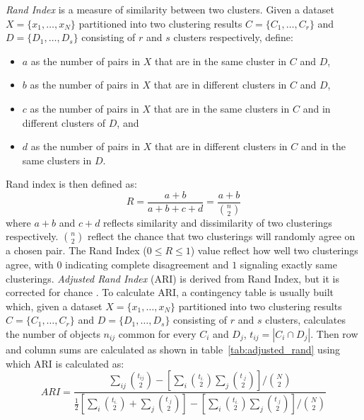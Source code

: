 \textit{Rand Index} is a measure of similarity between two clusters. \citep{santos2009use}
Given a dataset $X = \{x_1, \dots, x_N\}$ partitioned into two clustering results
$C = \{C_1, \dots, C_r\}$ and $D = \{D_1, \dots, D_s\}$ consisting of $r$ and $s$ clusters
respectively, define:
\begin{itemize}
\item $a$ as the number of pairs in $X$ that are in the same cluster in $C$ and $D$,
\item $b$ as the number of pairs in $X$ that are in different clusters in $C$ and $D$,
\item $c$ as the number of pairs in $X$ that are in the same clusters in $C$ and in different clusters of $D$, and
\item $d$ as the number of pairs in $X$ that are in different clusters in $C$ and in the same clusters in $D$. 
\end{itemize}
Rand index is then defined as:
\begin{equation}\label{eq:rand_index}
	R = \frac{a + b}{a + b + c + d} = \frac{a + b}{\binom{n}{2}}
\end{equation}
where $a + b$ and $c + d$ reflects similarity and dissimilarity of two clusterings respectively.  
$\binom{n}{2}$ reflect the chance that two clusterings will randomly agree on a chosen pair. 
The Rand Index ($0 \leq R \leq 1$) value reflect how well two clusterings agree, with 
$0$ indicating complete disagreement and $1$ signaling exactly same clusterings. 
\textit{Adjusted Rand Index} (ARI) is derived from Rand Index, but it is corrected for chance
\citep{steinley2004properties}. To calculate ARI, a contingency table is usually built which, 
given a dataset $X = \{x_1, \dots, x_N\}$ partitioned into two clustering
results $C = \{C_1, \dots, C_r\}$ and $D = \{D_1, \dots, D_s\}$ consisting of
$r$ and $s$ clusters, calculates the number of objects $n_{ij}$ common for every
$C_i$ and $D_j$, $t_{ij} = |C_i \cap D_j|$. Then row and column sums are calculated 
as shown in table~\ref{tab:adjusted_rand} using which ARI is calculated as:
\begin{equation}\label{eq:adjusted_rand_index}
	ARI = \frac{\sum_{ij} \binom{t_{ij}}{2}- \left[ \sum_i \binom{t_{i.}}{2} \sum_j \binom{t_{.j}}{2} \right] / \binom{N}{2}}
	{\frac{1}{2} \left[ \sum_i \binom{t_{i.}}{2} + \sum_j \binom{t_{.j}}{2} \right] - 
	\left[ \sum_i \binom{t_{i.}}{2} \sum_j \binom{t_{.j}}{2} \right] / \binom{N}{2}
	}
\end{equation}

